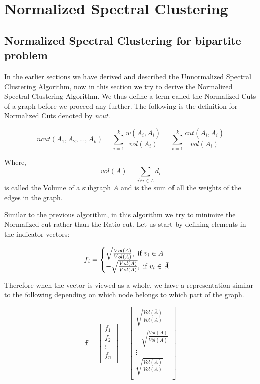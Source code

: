 \documentclass[english]{article}
\theoremstyle{plain}
\begin{document}
\section{Normalized Spectral Clustering}

\subsection{Normalized Spectral Clustering for bipartite problem}

In the earlier sections we have derived and described the Unnormalized Spectral Clustering Algorithm, now in this section we try to derive the Normalized Spectral Clustering Algorithm. We thus define a term called the Normalized Cuts of a graph before we proceed any further. The following is the definition for Normalized Cuts denoted by \textit{ncut}.

\begin{equation}
ncut(A_{1},A_{2},...,A_{k}) = \sum_{i=1}^{k} \frac{w(A_{i},\bar{A}_{i})}{vol(A_{i})} = \sum_{i=1}^{k} \frac{cut(A_{i},\bar{A}_{i})}{vol(A_{i})}
\end{equation}

Where,
\begin{equation}
vol(A) = \sum_{i \forall i \in A} d_{i}
\end{equation}
is called the Volume of a subgraph $A$ and is the sum of all the weights of the edges in the graph.

Similar to the previous algorithm, in this algorithm we try to minimize the Normalized cut rather than the Ratio cut. Let us start by defining elements in the indicator vectors:

\begin{equation}
f_i = \begin{cases}
\sqrt{\frac{Vol(\bar{A})}{Vol(A)}},\textnormal{ if } v_{i} \in A \\
-\sqrt{\frac{Vol(A)}{Vol(\bar{A})}},\textnormal{ if } v_{i} \in \bar{A} \\
\end{cases}
\end{equation}

Therefore when the vector is viewed as a whole, we have a representation similar to the following depending on which node belongs to which part of the graph.

\begin{equation}
\boldsymbol{f} = 
\begin{bmatrix}
f_{1}\\
f_{2}\\
\vdots\\
f_{n}\\
\end{bmatrix} = 
\begin{bmatrix}
\sqrt{\frac{Vol(\bar{A})}{Vol(A)}}  \\
-\sqrt{\frac{Vol(A)}{Vol(\bar{A})}} \\
\vdots\\
\sqrt{\frac{Vol(\bar{A})}{Vol(A)}}\\
\end{bmatrix}
\end{equation}
\end{document}
